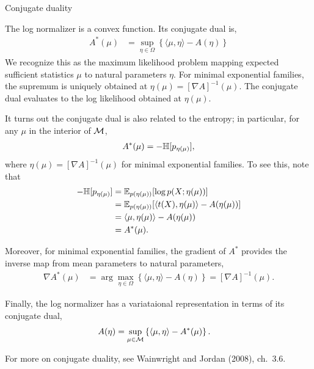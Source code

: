 \documentclass[aspectratio=169]{beamer}
\begin{document}
\begin{frame}[t,allowframebreaks]{Conjugate duality}\label{conjugate-duality}

The log normalizer is a convex function. Its conjugate dual is,
\begin{align*}
A^*(\mu) &= \sup_{\eta \in \Omega} \left\{ \langle \mu, \eta \rangle - A(\eta) \right\}
\end{align*} We recognize this as the maximum likelihood problem mapping
expected sufficient statistics \(\mu\) to natural parameters \(\eta\).
For minimal exponential families, the supremum is uniquely obtained at
\(\eta(\mu) = [\nabla A]^{-1}(\mu)\). The conjugate dual evaluates to
the log likelihood obtained at \(\eta(\mu)\).

It turns out the conjugate dual is also related to the entropy; in
particular, for any \(\mu\) in the interior of \(\mathcal{M}\), \begin{align*}
A^*(\mu) = - \mathbb{H}[p_{\eta(\mu)}],
\end{align*} where \(\eta(\mu) = [\nabla A]^{-1}(\mu)\) for minimal
exponential families. To see this, note that \begin{align*}
-\mathbb{H}[p_{\eta(\mu)}] 
&= \mathbb{E}_{p(\eta(\mu))}[\log p(X; \eta(\mu))] \\
&= \mathbb{E}_{p(\eta(\mu))}[\langle t(X), \eta(\mu) \rangle - A(\eta(\mu))] \\
&= \langle \mu, \eta(\mu) \rangle - A(\eta(\mu)) \\
&= A^*(\mu).
\end{align*}

Moreover, for minimal exponential families, the gradient of \(A^*\)
provides the inverse map from mean parameters to natural parameters,
\begin{align*}
\nabla A^*(\mu) &= \arg \max_{\eta \in \Omega} \left\{ \langle \mu, \eta \rangle - A(\eta) \right\} 
= [\nabla A]^{-1}(\mu).
\end{align*}

Finally, the log normalizer has a variataional representation in terms
of its conjugate dual, \begin{align*}
A(\eta) &= \sup_{\mu \in \mathcal{M}} \left\{ \langle \mu, \eta \rangle - A^*(\mu) \right\}.
\end{align*}

For more on conjugate duality, see
Wainwright and Jordan (2008), ch.~3.6.
\end{frame}
\end{document}
